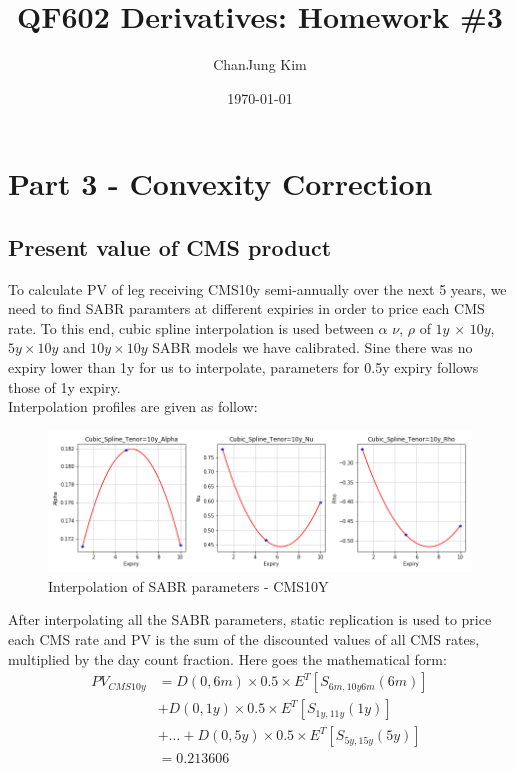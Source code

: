 \documentclass{article}
\title{QF602 Derivatives: Homework \#3} %
\author{ChanJung Kim}
\date{\today} %
\begin{document}
	
	\maketitle %
	
	\section*{Part 3 - Convexity Correction} %
	
	\subsection*{Present value of CMS product}	
	\noindent To calculate PV of leg receiving CMS10y semi-annually over the next 5 years, we need to find SABR paramters at different expiries in order to price each CMS rate. To this end, cubic spline interpolation is used between $\alpha$ $\nu$, $\rho$ of $1y$ $\times$ $10y$, $5y\times10y$ and $10y\times10y$ SABR models we have calibrated. Sine there was no expiry lower than 1y for us to interpolate, parameters for 0.5y expiry follows those of 1y expiry.\\
	
	Interpolation profiles are given as follow:\\
	
	\begin{figure}[h]
	\centering
	\includegraphics[scale=0.5]{Cubic_10y.png}
	\caption{Interpolation of SABR parameters - CMS10Y}
	\end{figure}	
	
	\noindent After interpolating all the SABR parameters, static replication is used to price each CMS rate and PV is the sum of the discounted values of all CMS rates, multiplied by the day count fraction. Here goes the mathematical form:
	\begin{align*}
	PV_{CMS10y}&=D(0,6m)\times 0.5 \times E^T [S_{6m,10y6m}(6m)] \\&+ D(0,1y) \times 0.5 \times E^T [S_{1y,11y}(1y)]\\&+ \dots 
	+D(0,5y) \times 0.5 \times E^T [S_{5y,15y}(5y)]\\&= 0.213606
	\end{align*}
	
\end{document}
